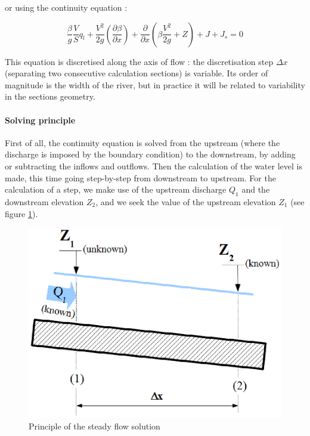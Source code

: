 or using the continuity equation :

\begin{equation}
\frac{\beta}{g} \frac{V}{S} q_l + \frac{V^2}{2 g} \left ( \frac{\partial \beta}{\partial x} \right ) + \frac{\partial}{\partial x} \left ( \beta \frac{V^2}{2 g} + Z \right ) + J + J_s = 0
\end{equation}

\vspace{0.5cm}

This equation is discretised along the axis of flow : the discretisation step $\Delta	x$ (separating two consecutive calculation sections) is variable. Its order of magnitude is the width of the river, but in practice it will be related to variability in the sections geometry.

\paragraph{Solving principle\\}

\hspace*{1cm}

First of all, the continuity equation is solved from the upstream (where the discharge is imposed by the boundary condition) to the downstream, by adding or subtracting the inflows and outflows. Then the calculation of the water level is made, this time going step-by-step from downstream to upstream. For the calculation of a step, we make use of the upstream discharge $Q_1$ and the downstream elevation $Z_2$, and we seek the value of the upstream elevation $Z_1$ (see figure \ref{PRP}).

\begin{figure}
 \begin{center}
  \includegraphics[scale=0.9]{Figures/Principe_Res_Perm.eps}
  \caption{Principle of the steady flow solution}
  \label{PRP}
 \end{center}
\end{figure}

